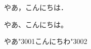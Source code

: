 \documentclass[uplatex,a6paper,papersize]{jsarticle}
\newcommand\読点{\char"3001}
\newcommand\句点{\char"3002}
\begin{document}
\huge

やあ，こんにちは．

やあ、こんにちは。

やあ\読点 こんにちわ\句点
\end{document}
